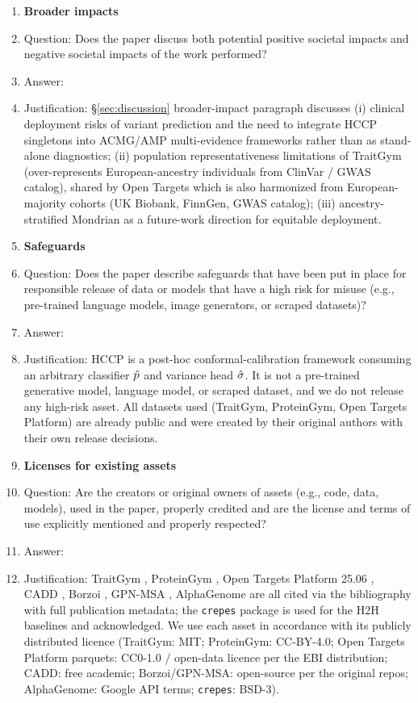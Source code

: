 \begin{enumerate}
\item {\bf Broader impacts}
    \item[] Question: Does the paper discuss both potential positive societal impacts and negative societal impacts of the work performed?
    \item[] Answer: \answerYes{}
    \item[] Justification: §\ref{sec:discussion} broader-impact paragraph discusses (i) clinical deployment risks of variant prediction and the need to integrate HCCP singletons into ACMG/AMP multi-evidence frameworks rather than as stand-alone diagnostics; (ii) population representativeness limitations of TraitGym (over-represents European-ancestry individuals from ClinVar / GWAS catalog), shared by Open Targets which is also harmonized from European-majority cohorts (UK Biobank, FinnGen, GWAS catalog); (iii) ancestry-stratified Mondrian as a future-work direction for equitable deployment.

\item {\bf Safeguards}
    \item[] Question: Does the paper describe safeguards that have been put in place for responsible release of data or models that have a high risk for misuse (e.g., pre-trained language models, image generators, or scraped datasets)?
    \item[] Answer: \answerNA{}
    \item[] Justification: HCCP is a post-hoc conformal-calibration framework consuming an arbitrary classifier $\hat{p}$ and variance head $\hat{\sigma}$. It is not a pre-trained generative model, language model, or scraped dataset, and we do not release any high-risk asset. All datasets used (TraitGym, ProteinGym, Open Targets Platform) are already public and were created by their original authors with their own release decisions.

\item {\bf Licenses for existing assets}
    \item[] Question: Are the creators or original owners of assets (e.g., code, data, models), used in the paper, properly credited and are the license and terms of use explicitly mentioned and properly respected?
    \item[] Answer: \answerYes{}
    \item[] Justification: TraitGym \citep{benegas2025traitgym}, ProteinGym \citep{notin2023proteingym}, Open Targets Platform 25.06 \citep{ochoa2023opentargets}, CADD \citep{kircher2014cadd}, Borzoi \citep{linder2025borzoi}, GPN-MSA \citep{benegas2023gpnmsa}, AlphaGenome \citep{avsec2026alphagenome} are all cited via the bibliography with full publication metadata; the \texttt{crepes} package \citep{bostrom2022crepes} is used for the H2H baselines and acknowledged. We use each asset in accordance with its publicly distributed licence (TraitGym: MIT; ProteinGym: CC-BY-4.0; Open Targets Platform parquets: CC0-1.0 / open-data licence per the EBI distribution; CADD: free academic; Borzoi/GPN-MSA: open-source per the original repos; AlphaGenome: Google API terms; \texttt{crepes}: BSD-3).


\end{enumerate}
